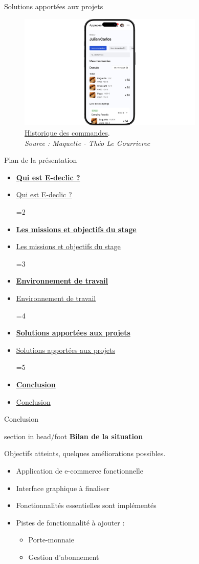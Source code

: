 \documentclass{beamer}
\newcommand{\planLine}[4]{
  \ifnum#1=#2
    \item \hyperlink{#3}{\textbf{\large #4}}
  \else
    \item \hyperlink{#3}{#4}
  \fi
}
\newcommand{\planSlide}[1]{
  	\begin{frame}{Plan de la présentation}
  		\begin{center}
  			\begin{minipage}{1\textwidth}
				\begin{itemize}
      			\planLine{#1}{1}{organisation}{Qui est E-declic ?}
      			\planLine{#1}{2}{sujet}{Les missions et objectifs du stage}
      			\planLine{#1}{3}{environnement}{Environnement de travail}
      			\planLine{#1}{4}{realisation}{Solutions apportées aux projets}
      			\planLine{#1}{5}{conclusion}{Conclusion}
	    		\end{itemize}
  		\end{minipage}
	\end{center}
	\vfill
	\end{frame}
}
\begin{document}
\begin{frame}{Solutions apportées aux projets}
\begin{center}
		 {
			\addtocounter{figure}{1}
			\begin{figure}[t]
  				\includegraphics[height=5.5cm]{../img/maquette/historique_commande.png}
				\caption{	
					\centering
  					\href{https://github.com/Matteo-K/Soutenance_E-delic/blob/main/img/maquette/historique_commande.png}{\underline{Historique des commandes}}.\\
  					\textit{Source : Maquette - Théo Le Gourrierec}
				}
  				\label{fig:disponibilite_produit}
  			\end{figure}
		}
	\end{center}
	\vfill
\end{frame}

\planSlide{5}

\begin{frame}[label=conclusion]{Conclusion}
  	\begin{beamercolorbox}[wd=\paperwidth,ht=1.5em,dp=0.5em,leftskip=0.5cm]{section in head/foot}
  		\large \textbf{Bilan de la situation}
	\end{beamercolorbox}
	\vspace{0.5em}
	\begin{center}
  		\begin{minipage}{0.9\textwidth}
	  		Objectifs atteints, quelques améliorations possibles.
  			\begin{itemize}
  				\item Application de e-commerce fonctionnelle
			  	\item Interface graphique à finaliser
			  	\item Fonctionnalités essentielles sont implémentés
			  	\item Pistes de fonctionnalité à ajouter : 
			  	\begin{itemize}
			  		\item Porte-monnaie
			  		\item Gestion d'abonnement
			  	\end{itemize}
			\end{itemize}
  		\end{minipage}
	\end{center}
	\vfill
\end{frame}
\end{document}
